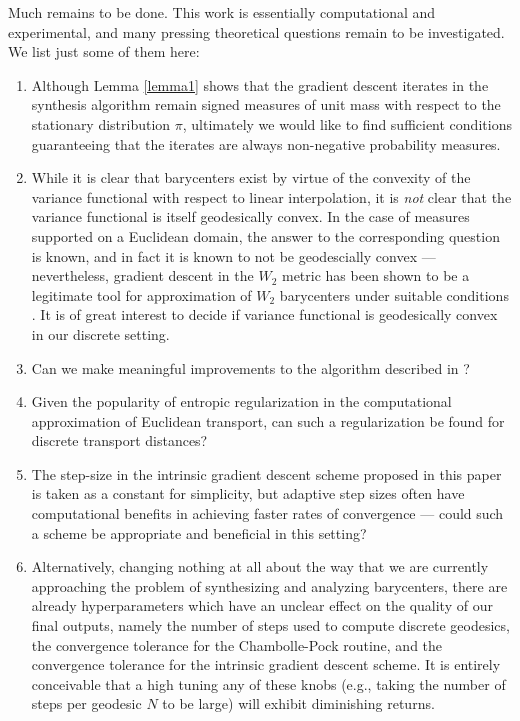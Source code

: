 \documentclass{article}
\begin{document}
Much remains to be done. This work is essentially computational and experimental, and many pressing theoretical questions remain to be investigated. We list just some of them here:
\begin{enumerate}
  \item Although Lemma \ref{lemma1} shows that the gradient descent iterates in the synthesis algorithm remain signed measures of unit mass with respect to the stationary distribution \(\pi\), ultimately we would like to find sufficient conditions guaranteeing that the iterates are always non-negative probability measures.
  \item While it is clear that barycenters exist by virtue of the convexity of the variance functional with respect to linear interpolation, it is \emph{not} clear that the variance functional is itself geodesically convex. In the case of measures supported on a Euclidean domain, the answer to the corresponding question is known, and in fact it is known to not be geodescially convex --- nevertheless, gradient descent in the \(W_2\) metric has been shown to be a legitimate tool for approximation of \(W_2\) barycenters under suitable conditions \cite{chewiGradientDescentAlgorithms2020}. It is of great interest to decide if variance functional is geodesically convex in our discrete setting.
  \item Can we make meaningful improvements to the algorithm described in \cite{erbarComputationOptimalTransport2020}?
  \item Given the popularity of entropic regularization in the computational approximation of Euclidean transport, can such a regularization be found for discrete transport distances?
  \item The step-size in the intrinsic gradient descent scheme proposed in this paper is taken as a constant for simplicity, but adaptive step sizes often have computational benefits in achieving faster rates of convergence \cite{afsariConvergenceGradientDescent2013, chambolleFirstOrderPrimalDualAlgorithm2011} --- could such a scheme be appropriate and beneficial in this setting?
  \item Alternatively, changing nothing at all about the way that we are currently approaching the problem of synthesizing and analyzing barycenters, there are already hyperparameters which have an unclear effect on the quality of our final outputs, namely the number of steps used to compute discrete geodesics, the convergence tolerance for the Chambolle-Pock routine, and the convergence tolerance for the intrinsic gradient descent scheme. It is entirely conceivable that a high tuning any of these knobs (e.g., taking the number of steps per geodesic \(N\) to be large) will exhibit diminishing returns.

\end{enumerate}
\end{document}
